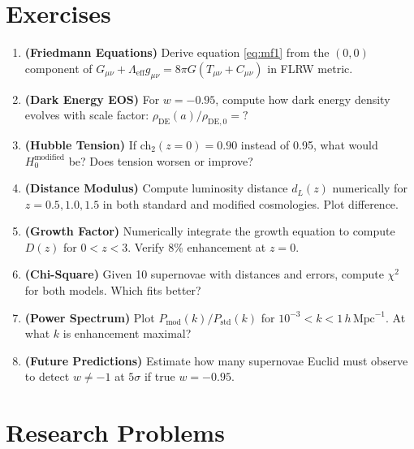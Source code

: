 \section*{Exercises}

\begin{enumerate}
\item \textbf{(Friedmann Equations)} Derive equation \eqref{eq:mf1} from the $(0,0)$ component of $G_{\mu\nu} + \Lambda_{\text{eff}} g_{\mu\nu} = 8\pi G (T_{\mu\nu} + C_{\mu\nu})$ in FLRW metric.

\item \textbf{(Dark Energy EOS)} For $w = -0.95$, compute how dark energy density evolves with scale factor: $\rho_{\text{DE}}(a) / \rho_{\text{DE},0} = ?$

\item \textbf{(Hubble Tension)} If ch$_2(z=0) = 0.90$ instead of 0.95, what would $H_0^{\text{modified}}$ be? Does tension worsen or improve?

\item \textbf{(Distance Modulus)} Compute luminosity distance $d_L(z)$ numerically for $z = 0.5, 1.0, 1.5$ in both standard and modified cosmologies. Plot difference.

\item \textbf{(Growth Factor)} Numerically integrate the growth equation to compute $D(z)$ for $0 < z < 3$. Verify 8\% enhancement at $z = 0$.

\item \textbf{(Chi-Square)} Given 10 supernovae with distances and errors, compute $\chi^2$ for both models. Which fits better?

\item \textbf{(Power Spectrum)} Plot $P_{\text{mod}}(k) / P_{\text{std}}(k)$ for $10^{-3} < k < 1 \, h \, \text{Mpc}^{-1}$. At what $k$ is enhancement maximal?

\item \textbf{(Future Predictions)} Estimate how many supernovae Euclid must observe to detect $w \neq -1$ at $5\sigma$ if true $w = -0.95$.
\end{enumerate}

\section*{Research Problems}

